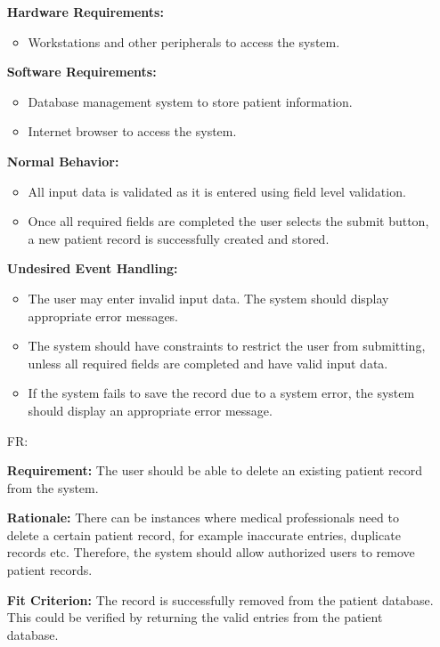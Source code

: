 \documentclass[12pt]{article}
\newcounter{reqnum} %
\begin{document}
\begin{itemize}
  \textbf{Hardware Requirements:} 
  \begin{itemize}
    \item Workstations and other peripherals to access the system.
  \end{itemize}
  
  \textbf{Software Requirements:} 
  \begin{itemize}
    \item Database management system to store patient information.
    \item Internet browser to access the system.
  \end{itemize}
  
  \textbf{Normal Behavior:} 
  \begin{itemize}
    \item All input data is validated as it is entered using field level validation. 
    \item Once all required fields are completed the user selects the submit button, a new patient record is successfully created and stored.
  \end{itemize}
  
  \textbf{Undesired Event Handling:} 
  \begin{itemize}
    \item The user may enter invalid input data. The system should display appropriate error messages. 
    \item The system should have constraints to restrict the user from submitting, unless all required fields are completed and have valid input data. 
    \item If the system fails to save the record due to a system error, the system should display an appropriate error message. 
  \end{itemize}
  
  
  \item[FR\refstepcounter{reqnum}\thereqnum \label{FR_deleteRecord}:]
  
  \textbf{Requirement:} The user should be able to delete an existing patient record from the system.
  
  \textbf{Rationale:} There can be instances where medical professionals need to delete a certain patient record, for example inaccurate entries, duplicate records etc. Therefore, the system should allow authorized users to remove patient records.
  
  \textbf{Fit Criterion:} The record is successfully removed from the patient database. This could be verified by returning the valid entries from the patient database.
  

\end{itemize}
\end{document}
